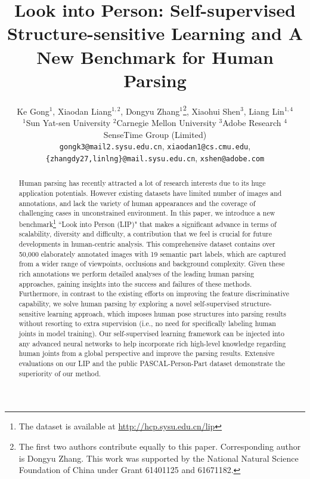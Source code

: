 \documentclass[10pt,twocolumn,letterpaper]{article}
\begin{document}
\title{Look into Person: Self-supervised Structure-sensitive Learning and A New Benchmark for Human Parsing}

\author{Ke Gong$^1$, \quad Xiaodan Liang$^{1,2}$, \quad Dongyu Zhang$^1$\thanks{The first two authors contribute equally to this paper. Corresponding author is Dongyu Zhang.   This work was supported by the National Natural Science Foundation of China under Grant 61401125 and 61671182.}, \quad Xiaohui Shen$^{3}$, \quad Liang Lin$^{1,4}$\\
$^1$Sun Yat-sen University \quad $^2$Carnegie Mellon University \quad $^3$Adobe Research \quad $^4$SenseTime Group (Limited) \\
	{\tt\footnotesize gongk3@mail2.sysu.edu.cn}, {\tt\small xiaodan1@cs.cmu.edu}, {\tt\small \{zhangdy27,linlng\}@mail.sysu.edu.cn}, {\tt\small xshen@adobe.com}
}

\maketitle


\begin{abstract}
Human parsing has recently attracted a lot of research interests due to its huge application potentials. However existing datasets have limited number of images and annotations, and lack the variety of human appearances and the coverage of challenging cases in unconstrained environment. In this paper, we introduce a new benchmark\footnote {The dataset is available at \url{http://hcp.sysu.edu.cn/lip}} ``Look into Person (LIP)" that makes a significant advance in terms of scalability, diversity and difficulty, a contribution that we feel is crucial for future developments in human-centric analysis. This comprehensive dataset contains over 50,000 elaborately  annotated images with 19 semantic part labels, which are captured from a wider range of viewpoints, occlusions and background complexity. Given these rich annotations we perform detailed analyses of the leading human parsing approaches, gaining insights into the success and failures of these methods. Furthermore, in contrast to the existing efforts on improving the feature discriminative capability, we solve human parsing by exploring a novel self-supervised structure-sensitive learning approach, which imposes human pose structures into parsing results without resorting to extra supervision (i.e., no need for specifically labeling human joints in model training). Our self-supervised learning framework can be injected into any advanced neural networks to help incorporate rich high-level knowledge regarding human joints from a global perspective  and improve the parsing results. Extensive evaluations on our LIP and the public PASCAL-Person-Part dataset demonstrate the superiority of our method.
\end{abstract}
\end{document}
